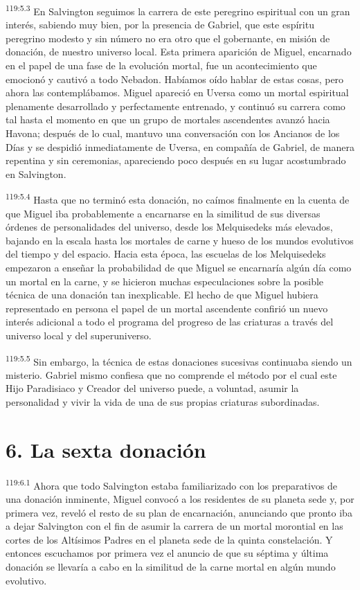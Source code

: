\par
\textsuperscript{119:5.3} En Salvington seguimos la carrera de este peregrino espiritual con un gran interés, sabiendo muy bien, por la presencia de Gabriel, que este espíritu peregrino modesto y sin número no era otro que el gobernante, en misión de donación, de nuestro universo local. Esta primera aparición de Miguel, encarnado en el papel de una fase de la evolución mortal, fue un acontecimiento que emocionó y cautivó a todo Nebadon. Habíamos oído hablar de estas cosas, pero ahora las contemplábamos. Miguel apareció en Uversa como un mortal espiritual plenamente desarrollado y perfectamente entrenado, y continuó su carrera como tal hasta el momento en que un grupo de mortales ascendentes avanzó hacia Havona; después de lo cual, mantuvo una conversación con los Ancianos de los Días y se despidió inmediatamente de Uversa, en compañía de Gabriel, de manera repentina y sin ceremonias, apareciendo poco después en su lugar acostumbrado en Salvington.

\par
\textsuperscript{119:5.4} Hasta que no terminó esta donación, no caímos finalmente en la cuenta de que Miguel iba probablemente a encarnarse en la similitud de sus diversas órdenes de personalidades del universo, desde los Melquisedeks más elevados, bajando en la escala hasta los mortales de carne y hueso de los mundos evolutivos del tiempo y del espacio. Hacia esta época, las escuelas de los Melquisedeks empezaron a enseñar la probabilidad de que Miguel se encarnaría algún día como un mortal en la carne, y se hicieron muchas especulaciones sobre la posible técnica de una donación tan inexplicable. El hecho de que Miguel hubiera representado en persona el papel de un mortal ascendente confirió un nuevo interés adicional a todo el programa del progreso de las criaturas a través del universo local y del superuniverso.

\par
\textsuperscript{119:5.5} Sin embargo, la técnica de estas donaciones sucesivas continuaba siendo un misterio. Gabriel mismo confiesa que no comprende el método por el cual este Hijo Paradisiaco y Creador del universo puede, a voluntad, asumir la personalidad y vivir la vida de una de sus propias criaturas subordinadas.

\section*{6. La sexta donación}
\par
\textsuperscript{119:6.1} Ahora que todo Salvington estaba familiarizado con los preparativos de una donación inminente, Miguel convocó a los residentes de su planeta sede y, por primera vez, reveló el resto de su plan de encarnación, anunciando que pronto iba a dejar Salvington con el fin de asumir la carrera de un mortal morontial en las cortes de los Altísimos Padres en el planeta sede de la quinta constelación. Y entonces escuchamos por primera vez el anuncio de que su séptima y última donación se llevaría a cabo en la similitud de la carne mortal en algún mundo evolutivo.

